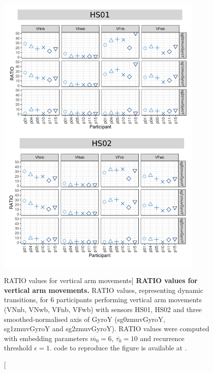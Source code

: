\begin{figure}
\centering
\includegraphics[width=0.9\textwidth]{rqa_ratio_V_w500}
    \caption
	[RATIO values for vertical arm movements]{
	{\bf RATIO values for vertical arm movements.}	
	RATIO values, representing dynamic transitions, 
	for 6 participants performing vertical arm movements 
	(VNnb, VNwb, VFnb, VFwb)
	with sensors HS01, HS02 and three smoothed-normalised axis 
	of GyroY (sg0zmuvGyroY, sg1zmuvGyroY and sg2zmuvGyroY).
	RATIO values were computed with 
	embedding parameters $\overline{m_0}=6$, $\overline{\tau_0}=10$ and
	recurrence threshold $\epsilon=1$.
		\R code to reproduce the figure is available at 
		.
        }
    \label{fig:rqa_ratio_V}
\end{figure}



